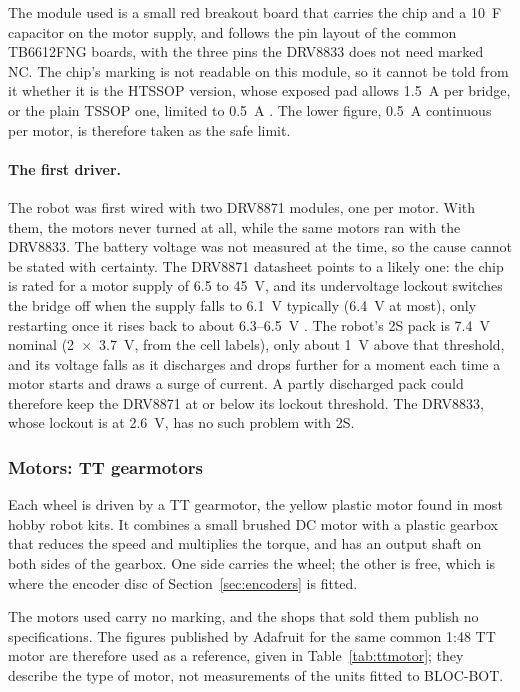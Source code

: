 The module used is a small red breakout board that carries the chip and a 10~\textmu F
capacitor on the motor supply, and follows the pin layout of the common TB6612FNG
boards, with the three pins the DRV8833 does not need marked NC. The chip's marking is
not readable on this module, so it cannot be told from it whether it is the HTSSOP version,
whose exposed pad allows 1.5~A per bridge, or the plain TSSOP one, limited to 0.5~A
\cite{drv8833_datasheet}. The lower figure, 0.5~A continuous per motor, is therefore
taken as the safe limit.

\paragraph{The first driver.} The robot was first wired with two DRV8871
modules, one per motor. With them, the motors never turned at all, while the same motors
ran with the DRV8833. The battery voltage was not measured at the time, so the cause
cannot be stated with certainty.
The DRV8871 datasheet points to a likely one: the chip is rated for a motor supply of
6.5 to 45~V, and its undervoltage lockout switches the bridge off when the supply falls
to 6.1~V typically (6.4~V at most), only restarting once it rises back to about
6.3--6.5~V \cite{drv8871_datasheet}. The robot's 2S pack is 7.4~V nominal
(2~\(\times\)~3.7~V, from the cell labels), only about 1~V above that threshold, and its
voltage falls as it discharges and drops further for a moment each time a motor starts
and draws a surge of current. A partly discharged pack could therefore keep the DRV8871
at or below its lockout threshold. The DRV8833, whose lockout is at 2.6~V, has no such
problem with 2S.

\subsubsection{Motors: TT gearmotors}
\label{sec:ttmotor}
Each wheel is driven by a TT gearmotor, the yellow plastic motor found in most
hobby robot kits. It combines a small brushed DC motor with a plastic gearbox that
reduces the speed and multiplies the torque, and has an output shaft on both sides of
the gearbox. One side carries the wheel; the other is free, which is where the encoder
disc of Section~\ref{sec:encoders} is fitted.

The motors used carry no marking, and the shops that sold them publish no
specifications. The figures published by Adafruit for the same common 1:48 TT motor
are therefore used as a reference, given in Table~\ref{tab:ttmotor}; they describe the
type of motor, not measurements of the units fitted to BLOC-BOT.

